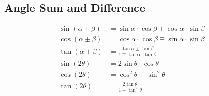 \documentclass{report}
\theoremstyle{mytheoremstyle}
\theoremstyle{mytheoremstyle}
\theoremstyle{myproblemstyle}
\begin{document}
    \subsection{Angle Sum and Difference}
    \begin{align}
        \sin(\alpha \pm \beta) &= \sin\alpha\cdot\cos\beta \pm \cos\alpha\cdot\sin\beta \\
        \cos(\alpha \pm \beta) &= \cos\alpha\cdot\cos\beta \mp \sin\alpha\cdot\sin\beta \\
        \tan(\alpha \pm \beta) &= \frac{\tan\alpha \pm \tan\beta}{1 \mp \tan\alpha\cdot\tan\beta} \\
        \sin(2\theta) &= 2\sin\theta\cdot\cos\theta \\
        \cos(2\theta) &= \cos^2\theta - \sin^2\theta \\
        \tan(2\theta) &= \frac{2\tan\theta}{1 - \tan^2\theta}
    \end{align}
\end{document}
